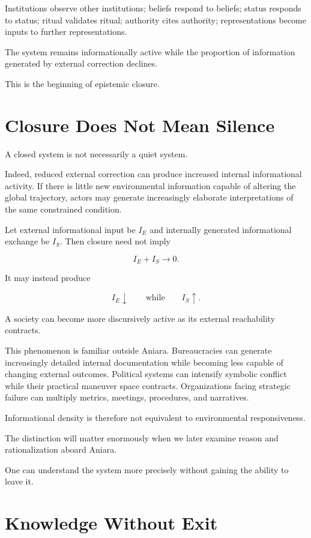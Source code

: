\documentclass[11pt,oneside]{book}
\theoremstyle{definition}
\theoremstyle{remark}
\begin{document}
Institutions observe other institutions; beliefs respond to beliefs; status responds to status; ritual validates ritual; authority cites authority; representations become inputs to further representations.

The system remains informationally active while the proportion of information generated by external correction declines.

This is the beginning of epistemic closure.

\section{Closure Does Not Mean Silence}

A closed system is not necessarily a quiet system.

Indeed, reduced external correction can produce increased internal informational activity. If there is little new environmental information capable of altering the global trajectory, actors may generate increasingly elaborate interpretations of the same constrained condition.

Let external informational input be \(I_E\) and internally generated informational exchange be \(I_S\). Then closure need not imply

\[
I_E+I_S\rightarrow0.
\]

It may instead produce

\[
I_E\downarrow
\qquad\text{while}\qquad
I_S\uparrow.
\]

A society can become more discursively active as its external reachability contracts.

This phenomenon is familiar outside Aniara. Bureaucracies can generate increasingly detailed internal documentation while becoming less capable of changing external outcomes. Political systems can intensify symbolic conflict while their practical maneuver space contracts. Organizations facing strategic failure can multiply metrics, meetings, procedures, and narratives.

Informational density is therefore not equivalent to environmental responsiveness.

The distinction will matter enormously when we later examine reason and rationalization aboard Aniara.

One can understand the system more precisely without gaining the ability to leave it.

\section{Knowledge Without Exit}
\end{document}
